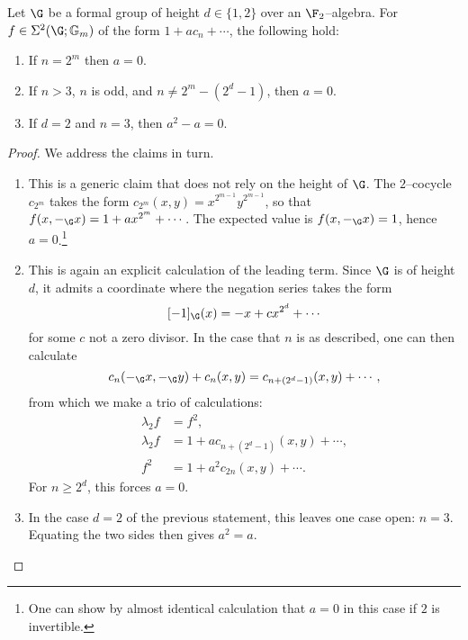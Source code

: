 \begin{lemma}\label{SigmaNonexistenceLemma}
Let \(\G\) be a formal group of height \(d \in \{1, 2\}\) over an \(\F_2\)--algebra.  For \(f \in \Sigma^2(\G; \Gm)\) of the form \(1 + a c_n + \cdots\), the following hold:
\begin{enumerate}
    \item If \(n = 2^m\) then \(a = 0\).
    \item If \(n > 3\), \(n\) is odd, and \(n \ne 2^m - (2^d - 1)\), then \(a = 0\).
    \item If \(d = 2\) and \(n = 3\), then \(a^2 - a = 0\).
\end{enumerate}
\end{lemma}
\begin{proof}
We address the claims in turn.
\begin{enumerate}
    \item This is a generic claim that does not rely on the height of \(\G\).  The \(2\)--cocycle \(c_{2^m}\) takes the form \(c_{2^m}(x, y) = x^{2^{m-1}} y^{2^{m-1}}\), so that \(f(x, -_{\G} x) = 1 + a x^{2^m} + \cdots\).  The expected value is \(f(x, -_{\G} x) = 1\), hence \(a = 0\).\footnote{One can show by almost identical calculation that \(a = 0\) in this case if \(2\) is invertible.}
    \item This is again an explicit calculation of the leading term.  Since \(\G\) is of height \(d\), it admits a coordinate where the negation series takes the form \[[-1]_{\G}(x) = -x + cx^{2^d} + \cdots\] for some \(c\) not a zero divisor.  In the case that \(n\) is as described, one can then calculate \[c_n(-_{\G} x, -_{\G} y) + c_n(x, y) = c_{n + (2^d-1)}(x, y) + \cdots,\] from which we make a trio of calculations:
    \begin{align*}
    \lambda_2 f & = f^2, \tag{uses \(f \in \Sigma^2(\G; \Gm)\)} \\
    \lambda_2 f & = 1 + ac_{n + (2^d-1)}(x, y) + \cdots, \tag{above observation} \\
    f^2 & = 1 + a^2 c_{2n}(x, y) + \cdots. \tag{characteristic \(2\)}
    \end{align*}
    For \(n \ge 2^d\), this forces \(a = 0\).
    \item In the case \(d = 2\) of the previous statement, this leaves one case open: \(n = 3\).  Equating the two sides then gives \(a^2 = a\).
    \qedhere
\end{enumerate}
\end{proof}

